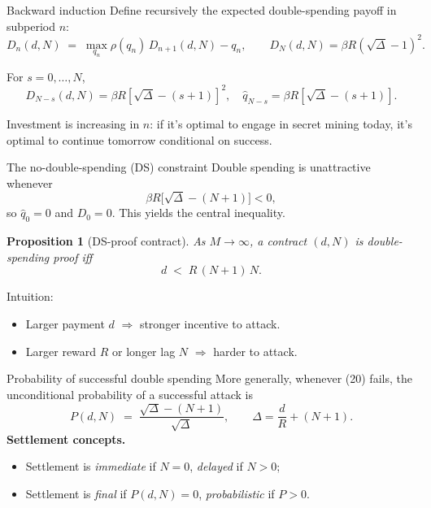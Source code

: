 \documentclass[aspectratio=169,xcolor=dvipsnames]{beamer}
\newtheorem{proposition}{Proposition}
\begin{document}
\begin{frame}{Backward induction}
    Define recursively the expected double-spending payoff in subperiod $n$:
    \[
        D_n(d,N) \;=\; \max_{q_n} \rho(q_n)\, D_{n+1}(d,N) - q_n, \qquad
        D_N(d,N) = \beta R(\sqrt\Delta-1)^2.
    \]
    \begin{lemma}
        For $s=0,\ldots,N$,
        \[
            D_{N-s}(d,N) = \beta R[\sqrt\Delta - (s+1)]^2,\quad
            \hat q_{N-s} = \beta R[\sqrt\Delta - (s+1)].
        \]
    \end{lemma}
    \vspace{2mm}
    Investment is increasing in $n$: if it's optimal to engage in secret mining today,
    it's optimal to continue tomorrow conditional on success.
\end{frame}

\begin{frame}{The no-double-spending (DS) constraint}
    Double spending is unattractive whenever
    \[
        \beta R\bigl[\sqrt\Delta - (N+1)\bigr] < 0,
    \]
    so $\hat q_0=0$ and $D_0=0$. This yields the central inequality.
    \vspace{3mm}
    \begin{proposition}[DS-proof contract]
        As $M\to\infty$, a contract $(d,N)$ is double-spending proof iff
        \[
            \boxed{\;d \;<\; R\,(N+1)\,N.\;} \tag{20}
        \]
    \end{proposition}
    \vspace{2mm}
    Intuition:
    \begin{itemize}
        \item Larger payment $d$ $\Rightarrow$ stronger incentive to attack.
        \item Larger reward $R$ or longer lag $N$ $\Rightarrow$ harder to attack.
    \end{itemize}
\end{frame}

\begin{frame}{Probability of successful double spending}
    More generally, whenever (20) fails, the unconditional probability of a successful attack is
    \[
        P(d,N) \;=\; \frac{\sqrt\Delta - (N+1)}{\sqrt\Delta},\qquad \Delta = \frac{d}{R} + (N+1).
    \]
    \vspace{2mm}
    \textbf{Settlement concepts.}
    \begin{itemize}
        \item Settlement is \emph{immediate} if $N=0$, \emph{delayed} if $N>0$;
        \item Settlement is \emph{final} if $P(d,N)=0$, \emph{probabilistic} if $P>0$.
    \end{itemize}
\end{frame}
\end{document}

